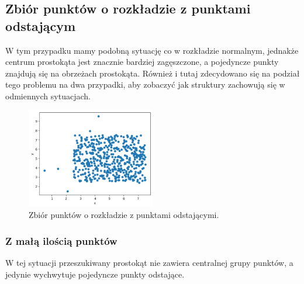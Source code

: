 \documentclass{lab}
\begin{document}
\subsection{Zbiór punktów o rozkładzie z punktami odstającym}
W tym przypadku mamy podobną sytuację co w rozkładzie normalnym, jednakże centrum prostokąta jest znacznie bardziej zagęszczone, a pojedyncze punkty znajdują się na obrzeżach prostokąta.
Również i tutaj zdecydowano się na podział tego problemu na dwa przypadki, aby zobaczyć jak struktury zachowują się w odmiennych sytuacjach.

\begin{figure}[H]
  \centering
  \includegraphics[width=0.5\textwidth]{resources/outlier.png}
  \caption{Zbiór punktów o rozkładzie z punktami odstającymi.}
  \label{fig:outlier}
\end{figure}

\subsubsection{Z małą ilością punktów}
W tej sytuacji przeszukiwany prostokąt nie zawiera centralnej grupy punktów, a jedynie wychwytuje pojedyncze punkty odstające.
\end{document}
